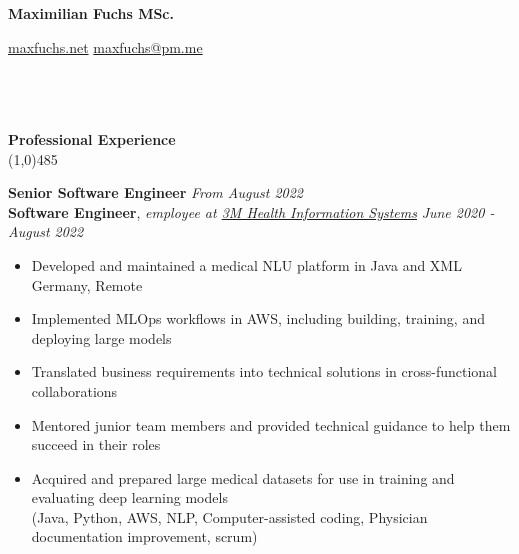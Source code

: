 \documentclass[9pt]{extarticle}
\newcommand\negativespace[1][-0.12cm]{\hspace*{#1}}
\begin{document}
\centerline{{\LARGE \bf Maximilian Fuchs MSc.}}
\centerline{\small \href{https://maxfuchs.net}{maxfuchs.net} \raisebox{0.25ex}{\tiny$\bullet$}  \href{mailto:maxfuchs@pm.me}{maxfuchs@pm.me}}


\noindent %
\\\\\\
\vspace*{-6pt}
{\negativespace \Large \bf Professional Experience}\\
\line(1,0){485}
\\
\noindent

\noindent
{\bf Senior Software Engineer}  \hfill \textit{From August 2022} \\
{\bf Software Engineer}, \textit{employee at \href{https://www.3m.com/3M/en_US/health-information-systems-us/support/international/}{3M Health Information Systems}}  \hfill \textit{June 2020 - August 2022} 
\begin{itemize}
\setlength\itemsep{0.05em}
\item Developed and maintained a medical NLU platform in Java and XML \hfill Germany, Remote
\item Implemented MLOps workflows in AWS, including building, training, and deploying large models
\item Translated business requirements into technical solutions in cross-functional collaborations
\item Mentored junior team members and provided technical guidance to help them succeed in their roles
\item Acquired and prepared large medical datasets for use in training and evaluating deep learning models \\
(Java, Python, AWS, NLP, Computer-assisted coding, Physician documentation improvement, scrum) \\
\end{itemize}
\end{document}
